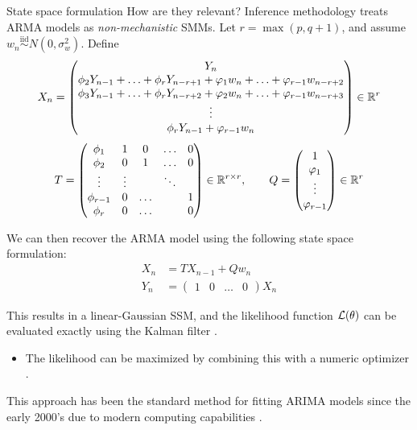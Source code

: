 \documentclass[aspectratio=169]{beamer}\usepackage[]{graphicx}\usepackage[]{xcolor}
\begin{document}
\begin{frame}[allowframebreaks]{State space formulation}
  How are they relevant? Inference methodology treats ARMA models as \emph{non-mechanistic} SMMs. Let $r = \max(p, q+1)$, and assume $w_n \overset{\mathrm{iid}}{\sim} N(0, \sigma^2_w)$. Define
  \begin{equation*}
    X_n = \begin{pmatrix}
  Y_n \\
  \phi_2 Y_{n - 1} + \ldots + \phi_r Y_{n - r + 1} + \varphi_{1}w_{n} + \ldots + \varphi_{r - 1}w_{n - r + 2} \\
    \phi_3 Y_{n - 1} + \ldots + \phi_r Y_{n - r + 2} + \varphi_{2}w_{n} + \ldots + \varphi_{r - 1}w_{n - r + 3} \\
    \vdots \\
    \phi_r Y_{n - 1} + \varphi_{r - 1}w_n
  \end{pmatrix} \in \mathbb{R}^r
  \end{equation*}
  \begin{equation*}
  T = \begin{pmatrix}
\phi_1 & 1 & 0 & \ldots & 0 \\
\phi_2 & 0 & 1 & \ldots & 0 \\
\vdots & \vdots & & \ddots & \\
\phi_{r-1} & 0 & \ldots &  & 1 \\
\phi_r & 0 & \ldots & & 0
\end{pmatrix} \in \mathbb{R}^{r \times r}, \quad\quad
Q = \begin{pmatrix}
  1 \\ \varphi_1 \\ \vdots \\ \varphi_{r - 1}
\end{pmatrix} \in \mathbb{R}^r
  \end{equation*}

We can then recover the ARMA model using the following state space formulation:
\begin{align*}
  X_n &= TX_{n - 1} + Qw_n \\
  Y_n &= \begin{pmatrix} 1 & 0 & \ldots & 0\end{pmatrix} X_n
\end{align*}

This results in a linear-Gaussian SSM, and the likelihood function $\mathcal{L}(\theta)$ can be evaluated exactly using the Kalman filter \citep{kalman60}.
\begin{itemize}
  \item The likelihood can be maximized by combining this with a numeric optimizer \citep{gardner1980}.
\end{itemize}

This approach has been the standard method for fitting ARIMA models since the early 2000's due to modern computing capabilities \citep{ripley2002}. 

\end{frame}
\end{document}
